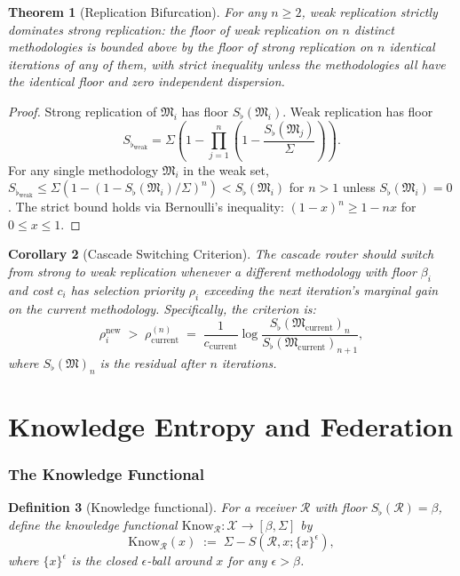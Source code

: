 \documentclass[11pt,a4paper]{article}
\newtheorem{theorem}{Theorem}[section]
\newtheorem{corollary}[theorem]{Corollary}
\newtheorem{definition}[theorem]{Definition}
\newcommand{\Cands}{\mathcal{X}}
\newcommand{\Method}{\mathfrak{M}}
\newcommand{\receiver}{\mathcal{R}}
\newcommand{\Sigmax}{\Sigma}
\newcommand{\Sscalar}{S}
\newcommand{\Sfloor}{S_{\flat}}
\newcommand{\Know}{\mathrm{Know}}
\begin{document}
\begin{theorem}[Replication Bifurcation]
\label{thm:replication-bifurcation}
For any $n \geq 2$, weak replication strictly dominates strong replication: the floor of weak replication on $n$ distinct methodologies is bounded above by the floor of strong replication on $n$ identical iterations of any of them, with strict inequality unless the methodologies all have the identical floor and zero independent dispersion.
\end{theorem}

\begin{proof}
Strong replication of $\Method_i$ has floor $\Sfloor(\Method_i)$. Weak replication has floor
\[
\Sfloor_{\text{weak}} = \Sigmax \left(1 - \prod_{j=1}^{n} \left(1 - \frac{\Sfloor(\Method_j)}{\Sigmax}\right)\right).
\]
For any single methodology $\Method_i$ in the weak set, $\Sfloor_{\text{weak}} \leq \Sigmax(1 - (1 - \Sfloor(\Method_i)/\Sigmax)^n) < \Sfloor(\Method_i)$ for $n > 1$ unless $\Sfloor(\Method_i) = 0$. The strict bound holds via Bernoulli's inequality: $(1-x)^n \geq 1 - nx$ for $0 \leq x \leq 1$.
\end{proof}

\begin{corollary}[Cascade Switching Criterion]
\label{cor:switching-criterion}
The cascade router should switch from strong to weak replication whenever a different methodology with floor $\beta_i$ and cost $c_i$ has selection priority $\rho_i$ exceeding the next iteration's marginal gain on the current methodology. Specifically, the criterion is:
\[
\rho_i^{\text{new}} \;>\; \rho_{\text{current}}^{(n)} \;=\; \frac{1}{c_{\text{current}}} \log\frac{\Sfloor(\Method_{\text{current}})_{n}}{\Sfloor(\Method_{\text{current}})_{n+1}},
\]
where $\Sfloor(\Method)_{n}$ is the residual after $n$ iterations.
\end{corollary}

\part{Knowledge Entropy and Federation}

\section{The Knowledge Functional}
\label{sec:knowledge-functional}

\begin{definition}[Knowledge functional]
\label{def:knowledge-functional}
For a receiver $\receiver$ with floor $\Sfloor(\receiver) = \beta$, define the \emph{knowledge functional} $\Know_{\receiver} : \Cands \to [\beta, \Sigmax]$ by
\[
\Know_{\receiver}(x) \;:=\; \Sigmax - \Sscalar(\receiver, x; \{x\}^{\epsilon}),
\]
where $\{x\}^{\epsilon}$ is the closed $\epsilon$-ball around $x$ for any $\epsilon > \beta$.
\end{definition}
\end{document}
